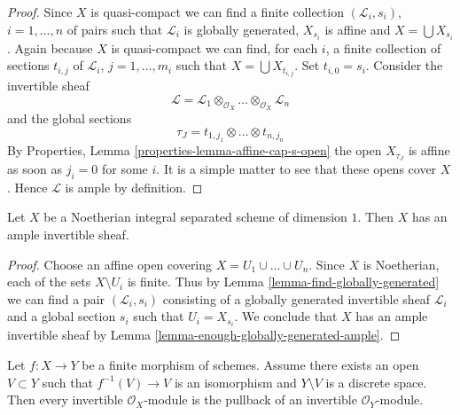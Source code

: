 \begin{proof}
Since $X$ is quasi-compact we can find a finite collection
$(\mathcal{L}_i, s_i)$, $i = 1, \ldots, n$
of pairs such that $\mathcal{L}_i$ is globally generated, $X_{s_i}$
is affine and $X = \bigcup X_{s_i}$.
Again because $X$ is quasi-compact we can find, for each $i$, a finite
collection of sections $t_{i, j}$ of $\mathcal{L}_i$, $j = 1, \ldots, m_i$
such that $X = \bigcup X_{t_{i, j}}$. Set $t_{i, 0} = s_i$.
Consider the invertible sheaf
$$
\mathcal{L} = \mathcal{L}_1 
\otimes_{\mathcal{O}_X} \ldots
\otimes_{\mathcal{O}_X} \mathcal{L}_n
$$
and the global sections
$$
\tau_J = t_{1, j_1} \otimes \ldots \otimes t_{n, j_n}
$$
By Properties, Lemma \ref{properties-lemma-affine-cap-s-open}
the open $X_{\tau_J}$ is affine as soon as $j_i = 0$ for some $i$.
It is a simple matter to see that these opens cover $X$.
Hence $\mathcal{L}$ is ample by definition.
\end{proof}

\begin{lemma}
\label{lemma-dim-1-noetherian-integral-separated-has-ample}
Let $X$ be a Noetherian integral separated scheme of dimension $1$.
Then $X$ has an ample invertible sheaf.
\end{lemma}

\begin{proof}
Choose an affine open covering $X = U_1 \cup \ldots \cup U_n$.
Since $X$ is Noetherian, each of the sets $X \setminus U_i$ is finite.
Thus by Lemma \ref{lemma-find-globally-generated}
we can find a pair $(\mathcal{L}_i, s_i)$
consisting of a globally generated invertible sheaf $\mathcal{L}_i$
and a global section $s_i$ such that $U_i = X_{s_i}$.
We conclude that $X$ has an ample invertible sheaf by
Lemma \ref{lemma-enough-globally-generated-ample}.
\end{proof}

\begin{lemma}
\label{lemma-surjective-pic-birational-finite}
Let $f : X \to Y$ be a finite morphism of schemes. Assume there
exists an open $V \subset Y$ such that $f^{-1}(V) \to V$ is an
isomorphism and $Y \setminus V$ is a discrete space. Then every
invertible $\mathcal{O}_X$-module is the pullback of an invertible
$\mathcal{O}_Y$-module.
\end{lemma}

